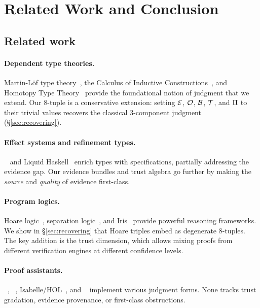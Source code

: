 \documentclass[11pt]{article}
\begin{document}
\section{Related Work and Conclusion}\label{sec:related}

\subsection{Related work}

\paragraph{Dependent type theories.}
Martin-L\"of type theory~\cite{martinlof84}, the Calculus of Inductive
Constructions~\cite{coquand88}, and Homotopy Type Theory~\cite{hott}
provide the foundational notion of judgment that we extend.  Our 8-tuple
is a conservative extension: setting $\mathcal{E}$, $\mathcal{O}$, $\mathcal{B}$,
$\mathcal{T}$, and $\Pi$ to their trivial values recovers the classical
3-component judgment (\S\ref{sec:recovering}).

\paragraph{Effect systems and refinement types.}
\Fstar{}~\cite{fstar} and Liquid Haskell~\cite{liquidhaskell} enrich
types with specifications, partially addressing the evidence gap.
Our evidence bundles and trust algebra go further by making the
\emph{source} and \emph{quality} of evidence first-class.

\paragraph{Program logics.}
Hoare logic~\cite{hoare69}, separation logic~\cite{reynolds02,iris},
and Iris~\cite{iris} provide powerful reasoning frameworks.
We show in \S\ref{sec:recovering} that Hoare triples embed as degenerate
8-tuples.  The key addition is the trust dimension, which allows mixing
proofs from different verification engines at different confidence levels.

\paragraph{Proof assistants.}
\LEAN{}~\cite{lean4}, \Coq{}~\cite{coq}, Isabelle/HOL~\cite{isabelle},
and \Dafny{}~\cite{dafny} implement various judgment forms.
None tracks trust gradation, evidence provenance, or first-class
obstructions.
\end{document}
